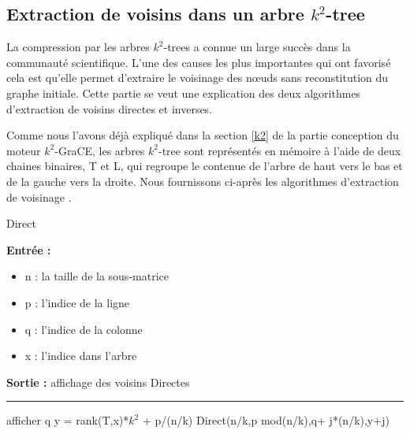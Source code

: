 \documentclass[a4paper,oneside,12pt]{report}
\theoremstyle{definition}
\begin{document}
\begin{appendix}


\chapter{Extraction de voisins dans un arbre $k^2$-tree}
    \label{k2_annexe}
La compression par les arbres $k^2$-trees a connue un large succès dans la communauté scientifique. L'une des causes les plus importantes qui ont favorisé cela est qu'elle permet d'extraire le voisinage des nœuds sans reconstitution du graphe initiale. Cette partie se veut une explication des deux algorithmes d'extraction de voisins directes et inverses. 

Comme nous l'avons déjà expliqué dans la section \ref{k2} de la partie conception   du moteur $k^2$-GraCE, les arbres $k^2$-tree sont représentés en mémoire à l'aide de deux chaines binaires, T et L, qui regroupe le contenue de l'arbre de haut vers le bas et de la gauche vers la droite. Nous fournissons ci-après les algorithmes d'extraction de voisinage \citep{brisaboa2009k}.



\begin{multicols}{2}

\begin{algorithm}[H]
					\label{alg:Direct}
					\caption{Direct}
					\textbf{Entrée :}
						\begin{itemize}[label=$\bullet$]
							\item n : la taille de la sous-matrice
							\item p : l'indice de la ligne 
							\item q : l'indice de la colonne
							\item x : l'indice dans l'arbre
						\end{itemize}
					\textbf{Sortie :} affichage des voisins Directes\\							\noindent\rule{\textwidth}{1pt}
						
						
				\begin{algorithmic} [1]
							\STATE afficher q
						\ENDIF
					\ELSE
							\STATE y = rank(T,x)*$k^2$ + p/(n/k)
								\STATE Direct(n/k,p mod(n/k),q+ j*(n/k),y+j)
							\ENDFOR
						\ENDIF
					\ENDIF 
					
					
				\end{algorithmic}
			\end{algorithm}



\end{multicols}
\end{appendix}
\end{document}
